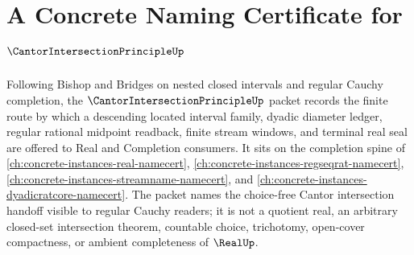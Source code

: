 \chapter{A Concrete Naming Certificate for $\CantorIntersectionPrincipleUp$}
\label{ch:concrete-instances-cantor-intersection-principle-namecert}

Following Bishop and Bridges on nested closed intervals and regular Cauchy completion, the $\CantorIntersectionPrincipleUp$ packet records the finite route by which a descending located interval family, dyadic diameter ledger, regular rational midpoint readback, finite stream windows, and terminal real seal are offered to Real and Completion consumers. It sits on the completion spine of \autoref{ch:concrete-instances-real-namecert}, \autoref{ch:concrete-instances-regseqrat-namecert}, \autoref{ch:concrete-instances-streamname-namecert}, and \autoref{ch:concrete-instances-dyadicratcore-namecert}. The packet names the choice-free Cantor intersection handoff visible to regular Cauchy readers; it is not a quotient real, an arbitrary closed-set intersection theorem, countable choice, trichotomy, open-cover compactness, or ambient completeness of $\RealUp$.

